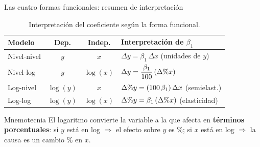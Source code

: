 \documentclass{beamer}
\newcommand{\pc}{\text{\char37}}
\begin{document}
\begin{frame}{Las cuatro formas funcionales: resumen de interpretación}

\begin{table}[H]
    \centering
    \renewcommand{\arraystretch}{1.4}
    \begin{tabular}{l|c|c|l}
       \textbf{Modelo}  & \textbf{Dep.} & \textbf{Indep.} & \textbf{Interpretación de }$\beta_1$ \\ \hline
       Nivel-nivel  & $y$ & $x$ & $\Delta y = \beta_1\,\Delta x$ (unidades de $y$) \\
       Nivel-log  & $y$ & $\log(x)$ & $\Delta y = \dfrac{\beta_1}{100}\,(\Delta\pc  x)$ \\
       Log-nivel  & $\log(y)$ & $x$ & $\Delta\pc  y = (100\,\beta_1)\,\Delta x$ \;(semielast.) \\
       Log-log  & $\log(y)$ & $\log(x)$ & $\Delta\pc  y = \beta_1\,(\Delta\pc  x)$ \;(elasticidad) \\
    \end{tabular}
    \caption{Interpretación del coeficiente según la forma funcional.}
\end{table}

\begin{block}{Mnemotecnia}
El logaritmo convierte la variable a la que afecta en \textbf{términos porcentuales}: si $y$ está en log $\Rightarrow$ el efecto sobre $y$ es \%; si $x$ está en log $\Rightarrow$ la causa es un cambio \% en $x$.
\end{block}

\end{frame}
\end{document}
